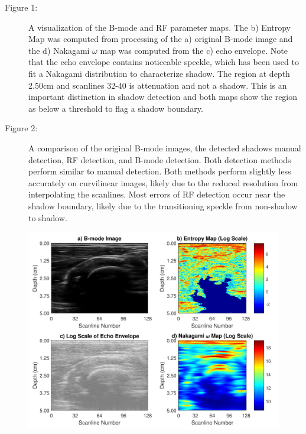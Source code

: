 \documentclass[preprint,5p,authoryear]{elsarticle}
\begin{document}
\begin{description}
\item[Figure 1:]  A visualization of the B-mode and RF parameter maps. The b) Entropy Map was computed from processing of the a) original B-mode image and the d) Nakagami $\omega$ map was computed from the c) echo envelope. Note that the echo envelope contains noticeable speckle, which has been used to fit a Nakagami distribution to characterize shadow. The region at depth 2.50cm and scanlines 32-40 is attenuation and not a shadow. This is an important distinction in shadow detection and both maps show the region as below a threshold to flag a shadow boundary.
\item[Figure 2:]  A comparison of the original B-mode images, the detected shadows manual detection, RF detection, and B-mode detection. Both detection methods perform similar to manual detection. Both methods perform slightly less accurately on curvilinear images, likely due to the reduced resolution from interpolating the scanlines. Most errors of RF detection occur near the shadow boundary, likely due to the transitioning speckle from non-shadow to shadow.
\end{description}

\begin{figure}[H]
	\centering
	\includegraphics[scale=0.5]{fig2.pdf}
\end{figure}
\end{document}

